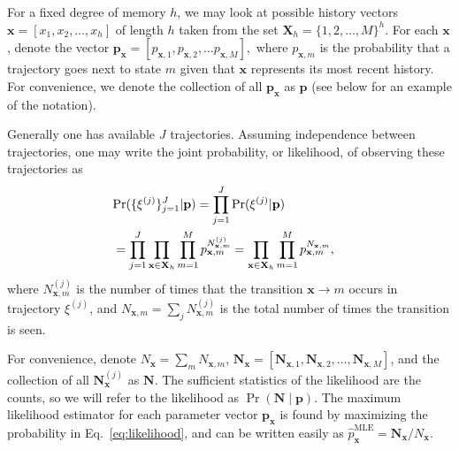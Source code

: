 \documentclass{IOS-Book-Article}
\newcommand{\bN}{\mathbf{N}}
\newcommand{\bx}{\mathbf{x}}
\newcommand{\bp}{\mathbf{p}}
\begin{document}
 For a fixed degree of memory $h$,
we may look at possible history vectors $\bx = [x_1,x_2,\ldots,x_h]$ of length $h$ taken from the set $\mathbf{X}_h = \{1,2,\ldots,M \}^h$. For each $\bx$, denote the vector $\mathbf{p}_{\bx} = [p_{\bx,1},p_{\bx,2},\ldots{p}_{\bx,M}],$ where $p_{\bx,m}$ is the probability that a trajectory goes next to state $m$ given that $\bx$ represents its most recent history. For convenience, we denote the collection of all $\bp_\bx$ as $\mathbf{p}$ (see below for an example of the notation).

Generally one has available  $J$ trajectories. Assuming independence between trajectories, one may write the joint probability, or likelihood, of observing these trajectories as
\begin{align}
\lefteqn{\Pr(\{\xi^{(j)} \}_{j=1}^J \vert \bp) = \prod_{j=1}^J \Pr(\xi^{(j)}\vert \bp)  } \nonumber\\
&= \prod_{j=1}^J \prod_{\bx\in\mathbf{X}_h} \prod_{m=1}^M p_{\bx,m}^{N^{(j)}_{\bx,m}} = \prod_{\bx\in\mathbf{X}_h} \prod_{m=1}^M p_{\bx,m}^{N_{\bx,m}} ,
\label{eq:likelihood}
\end{align}
where $N^{(j)}_{\bx,m}$ is the number of times that the transition $\bx\to m$ occurs in trajectory $\xi^{(j)}$, and $N_{\bx,m} = \sum_j N^{(j)}_{\bx,m}$ is the total number of times the transition is seen.%

For convenience,  denote $N_{\bx} =\sum_{m}N_{\bx,m}$,  $\bN_{\bx}= [\bN_{\bx,1},\bN_{\bx,2},\ldots,\bN_{\bx,M}]$, and the collection of all $\bN^{(j)}_{\bx}$ as $\bN$. The sufficient statistics of the likelihood are the counts, so we will refer to the likelihood as $\Pr(\bN\mid\bp)$. The maximum likelihood estimator for each parameter vector $\bp_\bx$ is found by maximizing the probability in Eq.~\ref{eq:likelihood}, and can be written easily as
$\hat{p}^{\textrm{MLE}}_{\bx} = \mathbf{N}_{\bx} / N_{\bx}$. 
\end{document}
